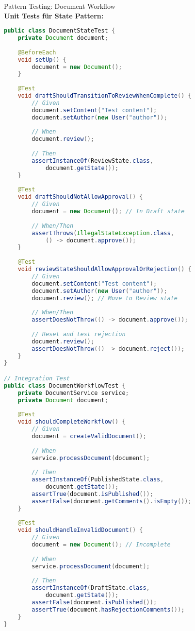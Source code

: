 \begin{example2}{Pattern Testing: Document Workflow}\\
\textbf{Unit Tests für State Pattern:}

\begin{lstlisting}[language=Java, style=basesmol]
public class DocumentStateTest {
    private Document document;
    
    @BeforeEach
    void setUp() {
        document = new Document();
    }
    
    @Test
    void draftShouldTransitionToReviewWhenComplete() {
        // Given
        document.setContent("Test content");
        document.setAuthor(new User("author"));
        
        // When
        document.review();
        
        // Then
        assertInstanceOf(ReviewState.class, 
            document.getState());
    }
    
    @Test
    void draftShouldNotAllowApproval() {
        // Given
        document = new Document(); // In Draft state
        
        // When/Then
        assertThrows(IllegalStateException.class, 
            () -> document.approve());
    }
    
    @Test
    void reviewStateShouldAllowApprovalOrRejection() {
        // Given
        document.setContent("Test content");
        document.setAuthor(new User("author"));
        document.review(); // Move to Review state
        
        // When/Then
        assertDoesNotThrow(() -> document.approve());
        
        // Reset and test rejection
        document.review();
        assertDoesNotThrow(() -> document.reject());
    }
}

// Integration Test
public class DocumentWorkflowTest {
    private DocumentService service;
    private Document document;
    
    @Test
    void shouldCompleteWorkflow() {
        // Given
        document = createValidDocument();
        
        // When
        service.processDocument(document);
        
        // Then
        assertInstanceOf(PublishedState.class, 
            document.getState());
        assertTrue(document.isPublished());
        assertFalse(document.getComments().isEmpty());
    }
    
    @Test
    void shouldHandleInvalidDocument() {
        // Given
        document = new Document(); // Incomplete
        
        // When
        service.processDocument(document);
        
        // Then
        assertInstanceOf(DraftState.class, 
            document.getState());
        assertFalse(document.isPublished());
        assertTrue(document.hasRejectionComments());
    }
}
\end{lstlisting}
\end{example2}

